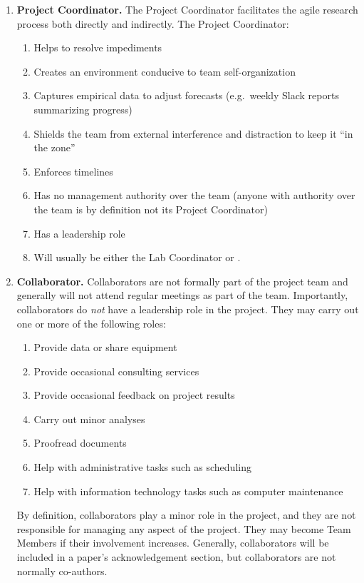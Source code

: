\documentclass{tufte-book} %
\begin{document}
\begin{enumerate}
\item \textbf{Project Coordinator.} The Project Coordinator facilitates
  the agile research process both directly and indirectly. The Project Coordinator:
\begin{enumerate}
\item Helps to resolve impediments 
\item Creates an environment conducive to team self-organization
\item Captures empirical data to adjust forecasts (e.g.\ weekly Slack
  reports summarizing progress)
\item Shields the team from external interference and distraction to
  keep it ``in the zone''
\item Enforces timelines
\item Has no management authority over the team (anyone with authority
  over the team is by definition not its Project
  Coordinator)
\item Has a leadership role
\item Will usually be either the Lab Coordinator or \director. %
\end{enumerate}

\item \textbf{Collaborator.}  Collaborators are not formally part of
  the project team and generally will not attend regular meetings as
  part of the team.  Importantly, collaborators do \textit{not} have a leadership role in
  the project.  They may carry out one or more of the
  following roles:
\begin{enumerate}
\item Provide data or share equipment 
\item Provide occasional consulting services
\item Provide occasional feedback on project results
\item Carry out minor analyses
\item Proofread documents
\item Help with administrative tasks such as scheduling
\item Help with information technology tasks such as computer
  maintenance

\end{enumerate}
By definition, collaborators play a minor role in the project, and they are not
responsible for managing any aspect of the project.  They may become Team
Members if their involvement increases.  Generally, collaborators will
be included in a paper's acknowledgement section, but collaborators
are not normally co-authors.
\end{enumerate}
\end{document}

